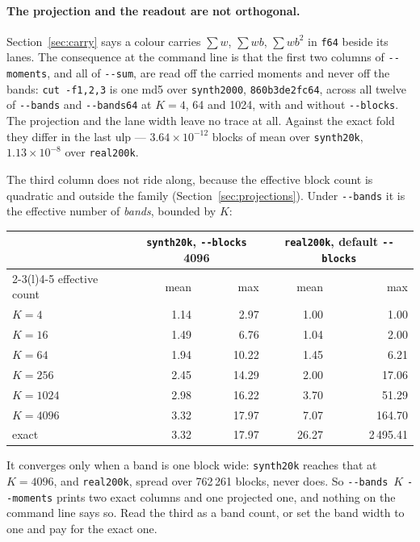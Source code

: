 \documentclass[11pt,a4paper]{article}
\newcommand{\flag}[1]{\texttt{-{}-#1}}
\begin{document}
\paragraph{The projection and the readout are not orthogonal.}
Section~\ref{sec:carry} says a colour
carries $\sum w$, $\sum wb$, $\sum wb^2$ in \texttt{f64} beside its lanes. The
consequence at the command line is that the first two columns of \flag{moments},
and all of \flag{sum}, are read off the carried moments and never off the bands:
\texttt{cut -f1,2,3} is one md5 over \texttt{synth2000},
\texttt{860b3de2fc64}, across all twelve of
\flag{bands} and \flag{bands64} at $K=4$, 64 and 1024, with and without
\flag{blocks}. The projection and the lane width leave no trace at all. Against
the exact fold they differ in the last ulp --- $3.64\times10^{-12}$ blocks of
mean over \texttt{synth20k}, $1.13\times10^{-8}$ over \texttt{real200k}.

The third column does not ride along, because the effective block count is
quadratic and outside the family (Section~\ref{sec:projections}). Under
\flag{bands} it is the effective number of \emph{bands}, bounded by $K$:

\begin{center}\small
\begin{tabular}{lrrrr}
\toprule
 & \multicolumn{2}{c}{\texttt{synth20k}, \flag{blocks} 4096} & \multicolumn{2}{c}{\texttt{real200k}, default \flag{blocks}} \\
\cmidrule(lr){2-3}\cmidrule(l){4-5}
effective count & mean & max & mean & max \\
\midrule
$K=4$    & 1.14 & 2.97  & 1.00 & 1.00 \\
$K=16$   & 1.49 & 6.76  & 1.04 & 2.00 \\
$K=64$   & 1.94 & 10.22 & 1.45 & 6.21 \\
$K=256$  & 2.45 & 14.29 & 2.00 & 17.06 \\
$K=1024$ & 2.98 & 16.22 & 3.70 & 51.29 \\
$K=4096$ & 3.32 & 17.97 & 7.07 & 164.70 \\
exact    & 3.32 & 17.97 & 26.27 & 2\,495.41 \\
\bottomrule
\end{tabular}
\end{center}

It converges only when a band is one block wide: \texttt{synth20k} reaches that
at $K=4096$, and \texttt{real200k}, spread over 762\,261 blocks, never does. So
\flag{bands}~$K$ \flag{moments} prints two exact columns and one projected one,
and nothing on the command line says so. Read the third as a band count, or set
the band width to one and pay for the exact one.
\end{document}
